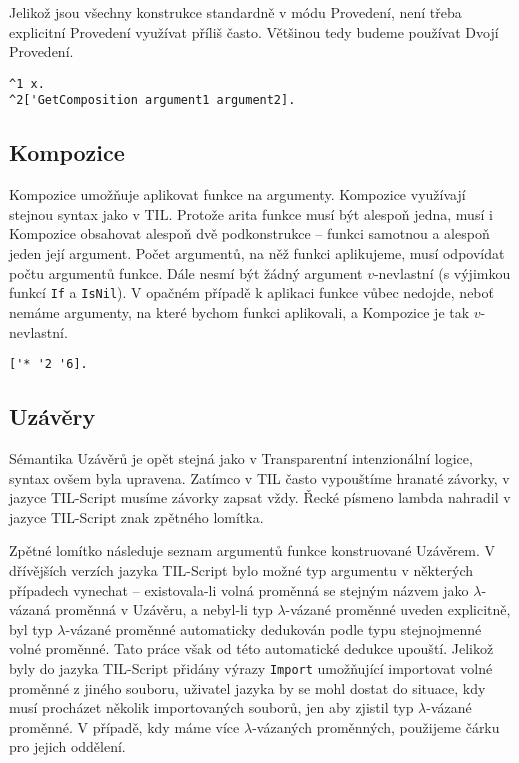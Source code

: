 Jelikož jsou všechny konstrukce standardně v módu Provedení, není třeba explicitní Provedení
využívat příliš často. Většinou tedy budeme používat Dvojí Provedení.

\begin{lstlisting}[caption={Příklad využití Provedení}]
^1 x.
^2['GetComposition argument1 argument2].
\end{lstlisting}

\subsection{Kompozice}

Kompozice umožňuje aplikovat funkce na argumenty. Kompozice využívají stejnou syntax jako v TIL.
Protože arita funkce musí být alespoň jedna, musí i Kompozice obsahovat alespoň dvě podkonstrukce
-- funkci samotnou a alespoň jeden její argument. Počet argumentů, na něž funkci aplikujeme, musí
odpovídat počtu argumentů funkce. Dále nesmí být žádný argument $v$-nevlastní (s výjimkou funkcí
\lstinline{If} a \lstinline{IsNil}). V opačném případě k aplikaci funkce vůbec nedojde, neboť
nemáme argumenty, na které bychom funkci aplikovali, a Kompozice je tak $v$-nevlastní.

\begin{lstlisting}[caption={Příklad využití Kompozice}]
['* '2 '6].
\end{lstlisting}

\subsection{Uzávěry}

Sémantika Uzávěrů je opět stejná jako v Transparentní intenzionální logice, syntax ovšem byla
upravena. Zatímco v TIL často vypouštíme hranaté závorky, v jazyce TIL-Script musíme závorky zapsat
vždy. Řecké písmeno lambda nahradil v jazyce TIL-Script znak zpětného lomítka.

Zpětné lomítko následuje seznam argumentů funkce konstruované Uzávěrem. V dřívějších verzích jazyka
TIL-Script bylo možné typ argumentu v některých případech vynechat -- existovala-li volná proměnná
se stejným názvem jako $\lambda$-vázaná proměnná v Uzávěru, a nebyl-li typ $\lambda$-vázané
proměnné uveden explicitně, byl typ $\lambda$-vázané proměnné automaticky dedukován podle typu
stejnojmenné volné proměnné. Tato práce však od této automatické dedukce upouští. Jelikož byly
do jazyka TIL-Script přidány výrazy \lstinline{Import} umožňující importovat volné proměnné z jiného
souboru, uživatel jazyka by se mohl dostat do situace, kdy musí procházet několik
importovaných souborů, jen aby zjistil typ $\lambda$-vázané proměnné. V případě, kdy máme více
$\lambda$-vázaných proměnných, použijeme čárku pro jejich oddělení.


